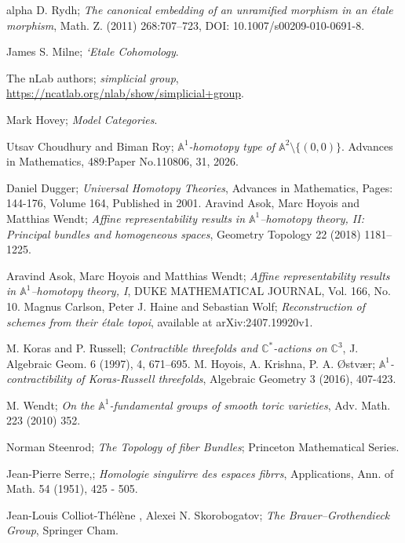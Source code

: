 \documentclass[11pt, reqno]{amsart}
\theoremstyle{plain}
\theoremstyle{definition}
\newcommand{\A}{{\mathbb A}}
\begin{document}
\begin{thebibliography}{alpha}
		 D. Rydh; \emph{The canonical embedding of an unramified morphism in an étale morphism}, Math. Z. (2011) 268:707–723, DOI: 10.1007/s00209-010-0691-8.

         James S. Milne; \emph{`Etale Cohomology}.

         The nLab authors; \emph{simplicial group}, \url{https://ncatlab.org/nlab/show/simplicial+group}.

         Mark Hovey; \emph{Model Categories}.
        
         Utsav Choudhury and Biman Roy; \emph{$\mathbb{A}^1$-homotopy type of $\mathbb{A}^2 \setminus \{(0, 0)\}$}. Advances in Mathematics, 489:Paper No.110806, 31, 2026.

          Daniel Dugger; \emph{Universal Homotopy Theories}, Advances in Mathematics, Pages: 144-176, Volume 164, Published in 2001.
   Aravind Asok, Marc Hoyois and Matthias Wendt; \emph{Affine representability results in $\mathbb{A}^1$–homotopy theory, II: Principal bundles and homogeneous spaces}, Geometry Topology 22 (2018) 1181–1225.

      Aravind Asok, Marc Hoyois and Matthias Wendt; \emph{Affine representability results in $\mathbb{A}^1$–homotopy theory, I}, DUKE MATHEMATICAL JOURNAL, Vol. 166, No. 10.
 Magnus Carlson, Peter J. Haine and Sebastian Wolf; \emph{Reconstruction of schemes from their \'etale topoi}, available at arXiv:2407.19920v1.

 M. Koras and P. Russell; \emph{Contractible threefolds and $\mathbb{C}^*$-actions on $\mathbb{C}^3$}, J. Algebraic Geom. 6 (1997), 4, 671–695.
 M. Hoyois, A. Krishna, P. A. Østvær; \emph{$\A^1$-contractibility of Koras-Russell threefolds}, Algebraic Geometry 3 (2016), 407-423.

 M. Wendt; \emph{On the $\mathbb{A}^1$-fundamental groups of smooth toric varieties}, Adv. Math. 223 (2010) 352.

 Norman Steenrod; \emph{The Topology of fiber Bundles}; Princeton Mathematical Series.

 Jean-Pierre Serre,; \emph{Homologie singulirre des espaces fibrrs}, Applications, Ann. of Math. 54 (1951), 425 - 505. 

 Jean-Louis Colliot-Thélène , Alexei N. Skorobogatov; \emph{The Brauer–Grothendieck Group}, Springer Cham.


\end{thebibliography}
\end{document}
